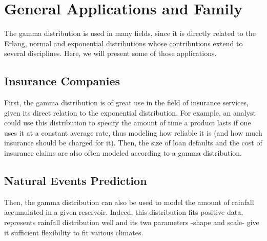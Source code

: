 \documentclass[12pt]{article}
\begin{document}

\pagebreak
\section{General Applications and Family}\label{sec:generalApplications}

The gamma distribution is used in many fields, since it is directly related to the Erlang, normal and exponential
distributions whose contributions extend to several disciplines. Here, we will present some of those applications.

\subsection{Insurance Companies}
First, the gamma distribution is of great use in the field of insurance services, given its direct relation to the
exponential distribution. For example, an analyst could use this distribution to specify the amount of time a product
lasts if one uses it at a constant average rate, thus modeling how reliable it is (and how much insurance should be
charged for it). Then, the size of loan defaults and the cost of insurance claims are also often modeled according to a
gamma distribution.

\subsection{Natural Events Prediction}
Then, the gamma distribution can also be used to model the amount of rainfall accumulated in a given reservoir. Indeed,
this distribution fits positive data, represents rainfall distribution well and its two parameters -shape and scale-
give it sufficient flexibility to fit various climates\cite{husakUseGammaDistribution2007}.
\end{document}
